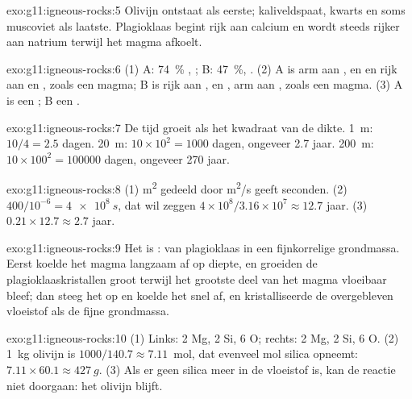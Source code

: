 \begin{solution}{exo:g11:igneous-rocks:5}
Olivijn ontstaat als eerste; kaliveldspaat, kwarts en soms muscoviet
als laatste. Plagioklaas begint rijk aan calcium en wordt steeds rijker aan
natrium terwijl het magma afkoelt.
\end{solution}

\begin{solution}{exo:g11:igneous-rocks:6}
(1) A: \qty{74}{\percent} , ; B: \qty{47}{\percent}, .
(2) A is arm aan ,  en  en rijk aan  en
, zoals een  magma; B is rijk aan ,  en ,
arm aan , zoals een  magma. (3) A is een ; B een .
\end{solution}

\begin{solution}{exo:g11:igneous-rocks:7}
De tijd groeit als het kwadraat van de dikte. \qty{1}{m}: $10/4 = 2.5$
dagen. \qty{20}{m}: $10 \times 10^2 = 1000$ dagen, ongeveer 2.7 jaar.
\qty{200}{m}: $10 \times 100^2 = \num{100000}$ dagen, ongeveer 270 jaar.
\end{solution}

\begin{solution}{exo:g11:igneous-rocks:8}
(1) \unit{m^2} gedeeld door \unit{m^2/s} geeft seconden. (2) $400/10^{-6} =
\qty{4e8}{s}$, dat wil zeggen $4 \times 10^8 / 3.16 \times 10^7 \approx 12.7$
jaar. (3) $0.21 \times 12.7 \approx 2.7$ jaar.
\end{solution}

\begin{solution}{exo:g11:igneous-rocks:9}
Het is :  van plagioklaas in een fijnkorrelige grondmassa.
Eerst koelde het magma langzaam af op diepte, en groeiden de plagioklaaskristallen
groot terwijl het grootste deel van het magma vloeibaar bleef; dan steeg het op en koelde het snel af,
en kristalliseerde de overgebleven vloeistof als de fijne grondmassa.
\end{solution}

\begin{solution}{exo:g11:igneous-rocks:10}
(1) Links: 2 Mg, 2 Si, 6 O; rechts: 2 Mg, 2 Si, 6 O. (2) \qty{1}{kg}
olivijn is $1000/140.7 \approx 7.11$~mol, dat evenveel mol
silica opneemt: $7.11 \times 60.1 \approx \qty{427}{g}$. (3) Als er geen silica meer in
de vloeistof is, kan de reactie niet doorgaan: het olivijn blijft.
\end{solution}

